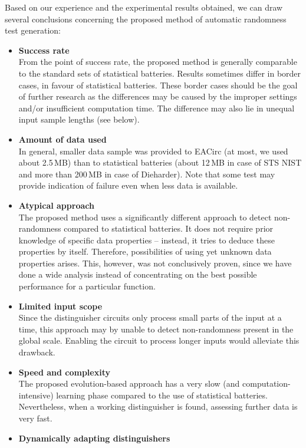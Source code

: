 \documentclass[12pt,oneside]{fithesis2}		%
\renewcommand{\_}{\leavevmode \kern0.0em\vbox{\hrule width0.4em}}
\newcommand{\squarebullet}{\textcolor{black}{\raisebox{0.15em}{\rule{4pt}{4pt}}}}
\newenvironment{myItemize}{
  \begin{itemize}[leftmargin=2em,rightmargin=1em,itemsep=\parskip ,parsep=0em,topsep=0em,partopsep=0em]
  \renewcommand{\labelitemi}{\squarebullet}
  \renewcommand{\labelitemii}{$\diamond$}
}{
  \end{itemize}
}
\begin{document}
Based on our experience and the experimental results obtained, we can draw several conclusions concerning the proposed
method of automatic randomness test generation:
\begin{myItemize}
\item \textbf{Success rate}\\
From the point of success rate, the proposed method is generally comparable to the standard sets of statistical batteries.
Results sometimes differ in border cases, in favour of statistical batteries.
These border cases should be the goal of further research as the differences may
be caused by the improper settings and/or insufficient computation time. The difference may also lie in unequal input sample lengths
(see below).
\item \textbf{Amount of data used}\\
In general, smaller data sample was provided to EACirc (at most, we used about 2.5\,MB) than to statistical batteries
(about 12\,MB in case of STS NIST and more than 200\,MB in case of Dieharder). Note that some test may provide indication
of failure even when less data is available.
\item \textbf{Atypical approach}\\
The proposed method uses a significantly different approach to detect non-randomness compared to statistical batteries.
It does not require prior knowledge of specific data properties -- instead, it tries to deduce these properties by itself.
Therefore, possibilities of using yet unknown data properties arises. This, however, was not conclusively proven, 
since we have done a wide analysis instead of concentrating on the best possible performance for a particular function.
\item \textbf{Limited input scope}\\
Since the distinguisher circuits only process small parts of the input at a time, this approach may by unable to detect
non-randomness present in the global scale. Enabling the circuit to process longer inputs would alleviate this drawback.
\item \textbf{Speed and complexity}\\
The proposed evolution-based approach has a very slow (and computation-intensive) 
learning phase compared to the use of statistical batteries.
Nevertheless, when a working distinguisher is found, assessing further data is very fast.
\item \textbf{Dynamically adapting distinguishers}\\

\end{myItemize}
\end{document}
